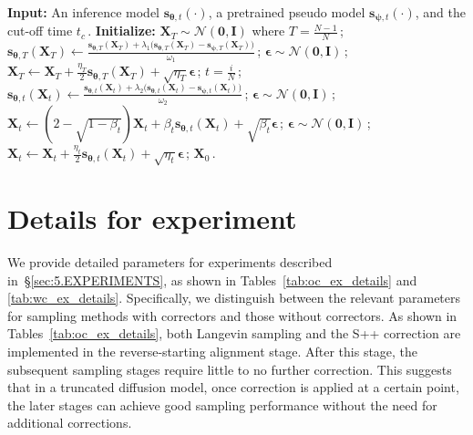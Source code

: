 \documentclass{article}
\newcommand{\s}{{{\bm s}}}
\newcommand{\X}{{{\bm X}}}
\newcommand{\EPS}{{\bm\epsilon}}
\newcommand{\THETA}{{\bm\theta}}
\newcommand{\PSI}{{\bm\psi}}
\begin{document}
\begin{algorithm}[!t]
\caption{The S++ sampling algorithm.}
\label{alg:s++}
\begin{algorithmic}
\STATE \textbf{Input:} An inference model $\s_{\THETA,t}(\cdot)$, a pretrained pseudo model $\s_{\PSI,t}(\cdot)$, and the cut-off time $t_c$\,.
\STATE \textbf{Initialize:} $\X_T \sim \mathcal{N}(\mathbf{0},\mathbf{I})$ where $T=\frac{N-1}{N}$\,;
\STATE $\s_{\THETA,T}(\X_T) \gets \frac{\s_{\THETA,T}(\X_T)+\lambda_1\bigl(\s_{\THETA,T}(\X_T)-\s_{\PSI,T}(\X_T)\bigr)}{\omega_1}$\,;
\STATE $\EPS \sim \mathcal{N}(\mathbf{0}, \mathbf{I})$\,;
\STATE $\X_T \leftarrow \X_T + \frac{\eta_T}2\s_{\THETA,T}(\X_T) + \sqrt{\eta_T}\EPS$\,;
\ENDFOR
{}
 \STATE $t=\frac iN$\,;
 \STATE $\s_{\THETA,t}(\X_t) \gets \frac{\s_{\THETA,t}(\X_t)+\lambda_2\bigl(\s_{\THETA,t}(\X_t)-\s_{\PSI,t}(\X_t)\bigr)}{\omega_2}$\,;
 \STATE $\EPS \sim \mathcal{N}(\mathbf{0}, \mathbf{I})$\,;
 \STATE $\X_t \gets  (2 - \sqrt{1- \beta_{t}}) \X_t + \beta_{t}\s_{\THETA,t}(\X_t) + \sqrt{\beta_{t}}\EPS$\,;
 \STATE $\EPS \sim \mathcal{N}(\mathbf{0}, \mathbf{I})$\,;
 \STATE $\X_t \gets \X_t + \frac{\eta_t}2\s_{\THETA,t}(\X_{t}) + \sqrt{\eta_t}\EPS$\,;
 \ENDIF
 \ENDIF
\ENDFOR
\RETURN $\X_0$\,.
\end{algorithmic}
\end{algorithm}

\section{Details for experiment}\label{appendix:D.Experiment detail}
We provide detailed parameters for experiments described in~\S\ref{sec:5.EXPERIMENTS}, as shown in Tables~\ref{tab:oc_ex_details} and \ref{tab:wc_ex_details}. Specifically, we distinguish between the relevant parameters for sampling methods with correctors and those without correctors. As shown in Tables~\ref{tab:oc_ex_details}, both Langevin sampling and the S++ correction are implemented in the reverse-starting alignment stage. After this stage, the subsequent sampling stages require little to no further correction. This suggests that in a truncated diffusion model, once correction is applied at a certain point, the later stages can achieve good sampling performance without the need for additional corrections.
\end{document}
